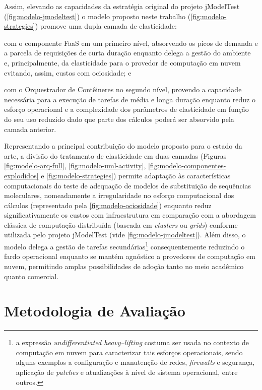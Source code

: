 \documentclass[english,brazilian]{UNISINOSmonografia} %
\begin{document}
Assim, elevando as capacidades da estratégia original do projeto jModelTest (\autoref{fig:modelo-jmodeltest}) o modelo proposto neste trabalho (\autoref{fig:modelo-strategies}) promove uma dupla camada de elasticidade:
\begin{inparaenum}[(i)]
	\item com o componente FaaS em um primeiro nível, absorvendo os picos de demanda e a parcela de requisições de curta duração enquanto delega a gestão do ambiente e, principalmente, da elasticidade para o provedor de computação em nuvem evitando, assim, custos com ociosidade; e
	\item com o Orquestrador de Contêineres no segundo nível, provendo a capacidade necessária para a execução de tarefas de média e longa duração enquanto reduz o esforço operacional e a complexidade dos parâmetros de elasticidade em função do seu uso reduzido dado que parte dos cálculos poderá ser absorvido pela camada anterior.
\end{inparaenum}


Representando a principal contribuição do modelo proposto para o estado da arte, a divisão do tratamento de elasticidade em duas camadas (Figuras \ref{fig:modelo-arq-full}, \ref{fig:modelo-uml-activity}, \ref{fig:modelo-componentes-explodidos} e \ref{fig:modelo-strategies}) permite adaptação às características computacionais do teste de adequação de modelos de substituição de sequências moleculares, nomeadamente a irregularidade no esforço computacional dos cálculos (representado pela \autoref{fig:modelo-ociosidade}) enquanto reduz significativamente os custos com infraestrutura em comparação com a abordagem clássica de computação distribuída (baseada em \textit{clusters} ou \textit{grids}) conforme utilizada pelo projeto jModelTest (vide \autoref{fig:modelo-jmodeltest}).
Além disso, o modelo delega a gestão de tarefas secundárias\footnote{
	a expressão \textit{undifferentiated heavy--lifting} costuma ser usada no contexto de computação em nuvem para caracterizar tais esforços operacionais, sendo alguns exemplos a configuração e manutenção de redes, \textit{firewalls} e segurança, aplicação de \textit{patches} e atualizações à nível de sistema operacional, entre outros.
} consequentemente reduzindo o fardo operacional enquanto se mantém agnóstico a provedores de computação em nuvem, permitindo amplas possibilidades de adoção tanto no meio acadêmico quanto comercial.



\chapter{Metodologia de Avaliação}
\label{ch:modelo-metodologia}
\end{document}
